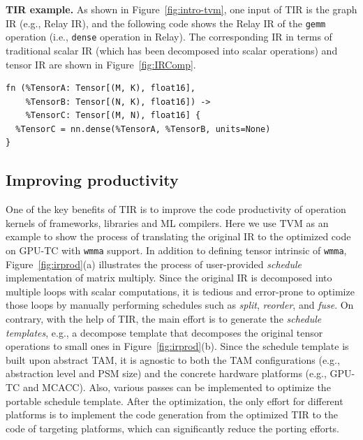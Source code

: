 \textbf{TIR example.} As shown in Figure~\ref{fig:intro-tvm}, one input of TIR is the graph IR (e.g., Relay IR), and the following code shows the Relay IR of the \texttt{gemm} operation (i.e., \texttt{dense} operation in Relay). The corresponding IR in terms of traditional scalar IR (which has been decomposed into scalar operations) and tensor IR are shown in Figure~\ref{fig:IRComp}.

\begin{scriptsize}
\begin{verbatim}
fn (%TensorA: Tensor[(M, K), float16], 
    %TensorB: Tensor[(N, K), float16]) -> 
    %TensorC: Tensor[(M, N), float16] {
  %TensorC = nn.dense(%TensorA, %TensorB, units=None)
}
\end{verbatim}
\end{scriptsize}

\subsection{Improving productivity}
One of the key benefits of TIR is to improve the code productivity of operation kernels of frameworks, libraries and ML compilers. Here we use TVM as an example to show the process of translating the original IR to the optimized code on GPU-TC with \texttt{wmma} support. In addition to defining tensor intrinsic of \texttt{wmma}, Figure~\ref{fig:irprod}(a) illustrates the process of user-provided \emph{schedule} implementation of matrix multiply. Since the original IR is decomposed into multiple loops with scalar computations, it is tedious and error-prone to optimize those loops by manually performing schedules such as \emph{split}, \emph{reorder}, and \emph{fuse}. On contrary, with the help of TIR, the main effort is to generate the \emph{schedule templates}, e.g., a decompose template that decomposes the original tensor operations to small ones in Figure~\ref{fig:irprod}(b). Since the schedule template is built upon abstract TAM, it is agnostic to both the TAM configurations (e.g., abstraction level and PSM size) and the concrete hardware platforms (e.g., GPU-TC and MCACC). Also, various passes can be implemented to optimize the portable schedule template. After the optimization, the only effort for different platforms is to implement the code generation from the optimized TIR to the code of targeting platforms, which can significantly reduce the porting efforts.

